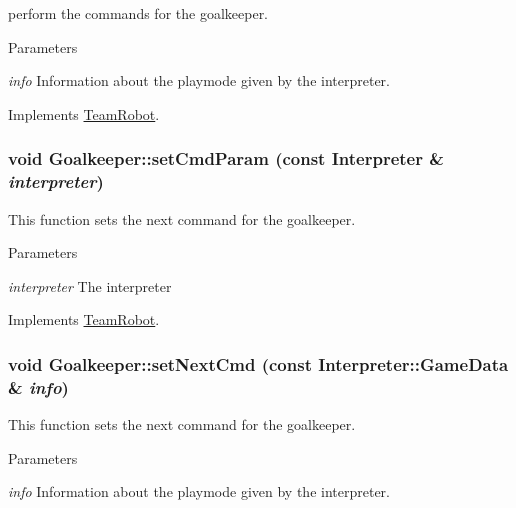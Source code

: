 perform the commands for the goalkeeper. 


\begin{DoxyParams}{Parameters}
\item[{\em info}]Information about the playmode given by the interpreter. \end{DoxyParams}


Implements \hyperlink{classTeamRobot_a9b84df51ca16a7203fdb6498ea6741da}{TeamRobot}.

\hypertarget{classGoalkeeper_acfa6fbad0f6b1627fd59cc7cce6ff321}{
\subsubsection[{setCmdParam}]{\setlength{\rightskip}{0pt plus 5cm}void Goalkeeper::setCmdParam (const {\bf Interpreter} \& {\em interpreter})}}
\label{classGoalkeeper_acfa6fbad0f6b1627fd59cc7cce6ff321}


This function sets the next command for the goalkeeper. 


\begin{DoxyParams}{Parameters}
\item[{\em interpreter}]The interpreter \end{DoxyParams}


Implements \hyperlink{classTeamRobot_a34c0fd6986c510d4025e5752b3c0e49a}{TeamRobot}.

\hypertarget{classGoalkeeper_abc394351f7c0d552c6e96da422c772ec}{
\subsubsection[{setNextCmd}]{\setlength{\rightskip}{0pt plus 5cm}void Goalkeeper::setNextCmd (const {\bf Interpreter::GameData} \& {\em info})}}
\label{classGoalkeeper_abc394351f7c0d552c6e96da422c772ec}


This function sets the next command for the goalkeeper. 


\begin{DoxyParams}{Parameters}
\item[{\em info}]Information about the playmode given by the interpreter. \end{DoxyParams}


